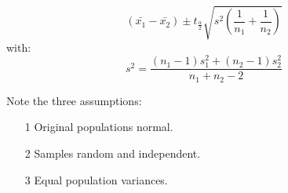 \documentclass[12pt, letterpaper]{article}
\begin{document}
\begin{itemize}
\begin{mdframed}[leftmargin=0.5cm, rightmargin=0.5cm]
\begin{equation*}
                        (\bar{x_1}-\bar{x_2})\pm t_{\frac{\alpha}{2}}\sqrt{s^2\left(\frac{1}{n_1}+\frac{1}{n_2}\right)}
                    \end{equation*}
                    with:
                    \begin{equation*}
                        s^2 = \frac{(n_1 - 1)s_1^2 + (n_2 - 1)s_2^2}{n_1 + n_2 - 2}
                    \end{equation*}
                \end{mdframed}
                Note the three assumptions:
                \begin{itemize}
                    \item[1] Original populations normal.
                    \item[2] Samples random and independent.
                    \item[3] Equal population variances. 
                \end{itemize}
            \end{itemize}
\end{document}
